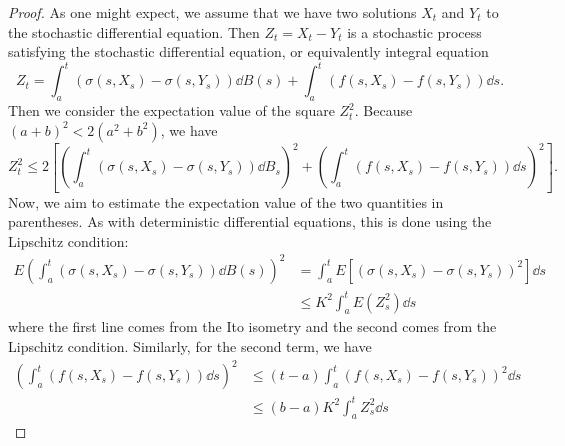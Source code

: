 \documentclass[prb,12pt]{revtex4-2}
\theoremstyle{definition}
\theoremstyle{definition}
\theoremstyle{definition}
\begin{document}
\begin{proof}
	As one might expect, we assume that we have two solutions $X_t$ and $Y_t$ to the stochastic differential equation. Then $Z_t=X_t-Y_t$ is a stochastic process satisfying the stochastic differential equation, or equivalently integral equation
	\[Z_t = \int_a^t (\sigma(s, X_s) - \sigma (s, Y_s))\dd{B(s)}+\int_a^t (f(s, X_s) - f(s, Y_s))\dd{s}.\]
	Then we consider the expectation value of the square $Z_t^2$. Because $(a+b)^2 < 2(a^2+b^2)$, we have
	\[Z_t^2 \le 2\left[\left(\int_a^t (\sigma(s, X_s) - \sigma(s, Y_s))\dd{B_s}\right)^2 + \left(\int_a^t (f(s, X_s) - f(s, Y_s))\dd{s}\right)^2\right].\]
	Now, we aim to estimate the expectation value of the two quantities in parentheses. As with deterministic differential equations, this is done using the Lipschitz condition:
	\begin{align*}
		E\left(\int_a^t (\sigma(s, X_s) - \sigma(s, Y_s))\dd{B(s)}\right)^2&= \int_a^t E[(\sigma(s, X_s)-\sigma(s, Y_s))^2]\dd{s}\\
		&\le K^2 \int_a^t E(Z_s^2)\dd{s}
	\end{align*} 
where the first line comes from the Ito isometry and the second comes from the Lipschitz condition. Similarly, for the second term, we have
\begin{align*}
	\left(\int_a^t (f(s, X_s) - f(s, Y_s))\dd{s}\right)^2 &\le (t-a)\int_a^t (f(s, X_s) - f(s, Y_s))^2 \dd{s}\\
	&\le (b-a)K^2 \int_a^t Z_s^2\dd{s}
\end{align*}
\end{proof}


\end{document}

